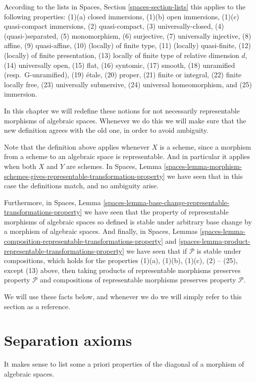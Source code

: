\medskip\noindent
According to the lists in
Spaces, Section \ref{spaces-section-lists}
this applies to the following properties:
(1)(a) closed immersions,
(1)(b) open immersions,
(1)(c) quasi-compact immersions,
(2) quasi-compact,
(3) universally-closed,
(4) (quasi-)separated,
(5) monomorphism,
(6) surjective,
(7) universally injective,
(8) affine,
(9) quasi-affine,
(10) (locally) of finite type,
(11) (locally) quasi-finite,
(12) (locally) of finite presentation,
(13) locally of finite type of relative dimension $d$,
(14) universally open,
(15) flat,
(16) syntomic,
(17) smooth,
(18) unramified (resp.\ G-unramified),
(19) \'etale,
(20) proper,
(21) finite or integral,
(22) finite locally free,
(23) universally submersive,
(24) universal homeomorphism, and
(25) immersion.

\medskip\noindent
In this chapter we will redefine these notions for not necessarily
representable morphisms of algebraic spaces. Whenever we do this we will make
sure that the new definition agrees with the old one, in order to avoid
ambiguity.

\medskip\noindent
Note that the definition above applies whenever $X$ is a scheme,
since a morphism from a scheme to an algebraic space is representable.
And in particular it applies when both $X$ and $Y$ are schemes.
In
Spaces, Lemma
\ref{spaces-lemma-morphism-schemes-gives-representable-transformation-property}
we have seen that in this case the definitions
match, and no ambiguity arise.

\medskip\noindent
Furthermore, in
Spaces, Lemma
\ref{spaces-lemma-base-change-representable-transformations-property}
we have seen that the property of
representable morphisms of algebraic spaces so defined is stable under
arbitrary base change by a morphism of algebraic spaces.
And finally, in
Spaces, Lemmas
\ref{spaces-lemma-composition-representable-transformations-property} and
\ref{spaces-lemma-product-representable-transformations-property}
we have seen that if $\mathcal{P}$ is stable under compositions,
which holds for the properties
(1)(a), (1)(b), (1)(c), (2) -- (25), except (13) above, then
taking products of representable morphisms preserves property $\mathcal{P}$
and compositions of representable morphisms preserves property $\mathcal{P}$.

\medskip\noindent
We will use these facts below, and whenever we do we will simply refer
to this section as a reference.

\section{Separation axioms}
\label{spaces-morphisms-section-separation-axioms}
It makes sense to list some a priori properties of the diagonal of
a morphism of algebraic spaces.


